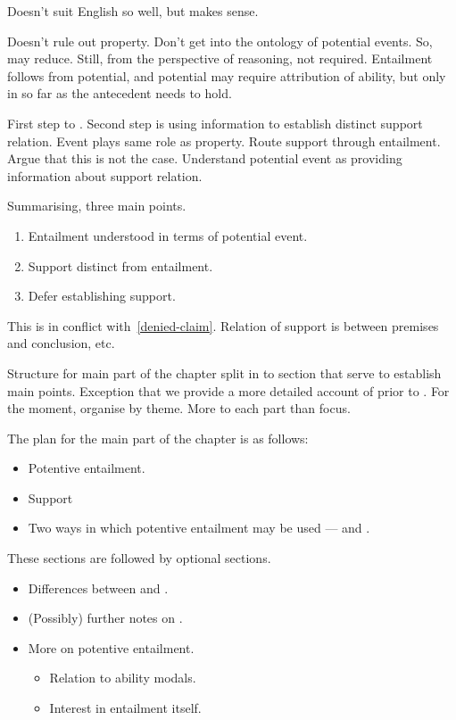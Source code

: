 \begin{note}
  Doesn't suit English so well, but makes sense.

  Doesn't rule out property.
  Don't get into the ontology of potential events.
  So, may reduce.
  Still, from the perspective of reasoning, not required.
  Entailment follows from potential, and potential may require attribution of ability, but only in so far as the antecedent needs to hold.

  First step to \WR{}.
  Second step is using information to establish distinct support relation.
  Event plays same role as property.
  Route support through entailment.
  Argue that this is not the case.
  Understand potential event as providing information about support relation.

  Summarising, three main points.
  \begin{enumerate}
  \item Entailment understood in terms of potential event.
  \item Support distinct from entailment.
  \item Defer establishing support.
  \end{enumerate}

  This is in conflict with~\ref{denied-claim}.
  Relation of support is between premises and conclusion, etc.

  Structure for main part of the chapter split in to section that serve to establish main points.
  Exception that we provide a more detailed account of \AR{} prior to \WR{}.
  For the moment, organise by theme.
  More to each part than focus.
\end{note}

\begin{note}
  The plan for the main part of the chapter is as follows:
  \begin{itemize}
  \item Potentive entailment.
  \item Support
  \item Two ways in which potentive entailment may be used --- \AR{} and \WR{}.
  \end{itemize}

  These sections are followed by optional sections.
  \begin{itemize}
  \item Differences between \AR{} and \WR{}.
  \item (Possibly) further notes on \WR{}.
  \item More on potentive entailment.
    \begin{itemize}
    \item Relation to ability modals.
    \item Interest in entailment itself.
    \end{itemize}
  \end{itemize}

\end{note}

